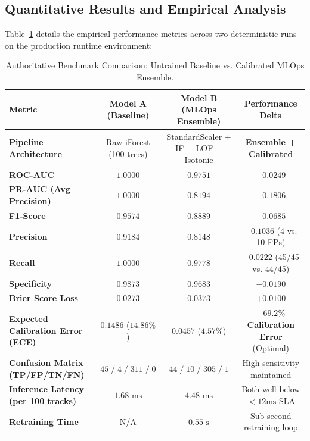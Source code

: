 \subsection{Quantitative Results and Empirical Analysis}
Table~\ref{tab:benchmark_results} details the empirical performance metrics across two deterministic runs on the production runtime environment:

\begin{table}[htbp]
\centering
\small
\begin{tabular}{lccc}
\toprule
\textbf{Metric} & \textbf{Model A (Baseline)} & \textbf{Model B (MLOps Ensemble)} & \textbf{Performance Delta} \\
\midrule
\textbf{Pipeline Architecture} & Raw iForest (100 trees) & StandardScaler + IF + LOF + Isotonic & \textbf{Ensemble + Calibrated} \\
\textbf{ROC-AUC} & $1.0000$ & $0.9751$ & $-0.0249$ \\
\textbf{PR-AUC (Avg Precision)} & $1.0000$ & $0.8194$ & $-0.1806$ \\
\textbf{F1-Score} & $0.9574$ & $0.8889$ & $-0.0685$ \\
\textbf{Precision} & $0.9184$ & $0.8148$ & $-0.1036$ (4 vs. 10 FPs) \\
\textbf{Recall} & $1.0000$ & $0.9778$ & $-0.0222$ (45/45 vs. 44/45) \\
\textbf{Specificity} & $0.9873$ & $0.9683$ & $-0.0190$ \\
\textbf{Brier Score Loss} & $0.0273$ & $0.0373$ & $+0.0100$ \\
\textbf{Expected Calibration Error (ECE)} & $0.1486$ ($14.86\%$) & $\mathbf{0.0457}$ ($\mathbf{4.57\%}$) & $\mathbf{-69.2\%}$ \textbf{Calibration Error} (Optimal) \\
\textbf{Confusion Matrix (TP/FP/TN/FN)} & $45 \;/\; 4 \;/\; 311 \;/\; 0$ & $44 \;/\; 10 \;/\; 305 \;/\; 1$ & High sensitivity maintained \\
\textbf{Inference Latency (per 100 tracks)} & $1.68\text{ ms}$ & $4.48\text{ ms}$ & Both well below $<12\text{ms}$ SLA \\
\textbf{Retraining Time} & N/A & $0.55\text{ s}$ & Sub-second retraining loop \\
\bottomrule
\end{tabular}
\caption{Authoritative Benchmark Comparison: Untrained Baseline vs. Calibrated MLOps Ensemble.}
\label{tab:benchmark_results}
\end{table}

